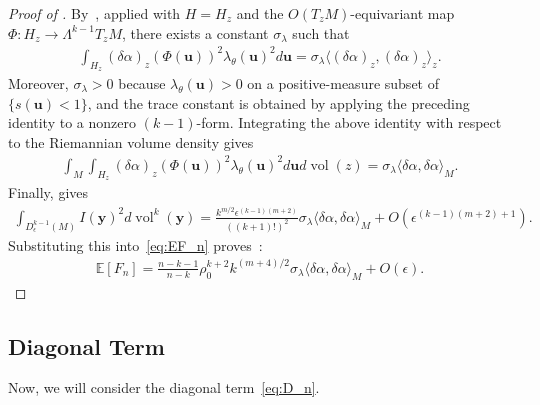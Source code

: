 \documentclass[11pt,reqno]{amsproc}
\numberwithin{equation}{section}
\newcommand{\E}{\mathbb{E}}
\newcommand{\by}{\mathbf{y}}
\newcommand{\bu}{\mathbf{u}}
\newcommand{\vol}{\operatorname{vol}}
\newcommand{\dvol}{d\!\vol}
\theoremstyle{definition}
\theoremstyle{plain}
\begin{document}
\begin{proof}[Proof of ]

By~, applied with $H=H_z$ and the $O(T_zM)$-equivariant map $\Phi:H_z\to \Lambda^{k-1}T_zM$, there exists a constant $\sigma_\lambda$ such that
\begin{align}
    \int_{H_z}(\delta\alpha)_z(\Phi(\bu))^2\lambda_\theta(\bu)^2d\bu=\sigma_\lambda\langle (\delta\alpha)_z,(\delta\alpha)_z\rangle_z.
\end{align}
Moreover, $\sigma_\lambda>0$ because $\lambda_\theta(\bu)>0$ on a positive-measure subset of $\{s(\bu)<1\}$, and the trace constant is obtained by applying the preceding identity to a nonzero $(k-1)$-form.
Integrating the above identity with respect to the Riemannian volume density gives
\begin{align}
    \int_M\int_{H_z}(\delta\alpha)_z(\Phi(\bu))^2\lambda_\theta(\bu)^2d\bu\dvol(z)=\sigma_\lambda\langle \delta\alpha,\delta\alpha\rangle_M.
\end{align}
Finally,  gives
\begin{align}
    \int_{D^{k-1}_\epsilon(M)}I(\by)^2\dvol^k(\by)
    =\frac{k^{m/2}\epsilon^{(k-1)(m+2)}}{((k+1)!)^2}\sigma_\lambda\langle\delta\alpha,\delta\alpha\rangle_M+O(\epsilon^{(k-1)(m+2)+1}).
\end{align}
Substituting this into~\eqref{eq:EF_n} proves~:
\begin{align}
    \E[F_n] = \frac{n-k-1}{n-k}\rho_0^{k+2}k^{(m+4)/2}\sigma_\lambda\langle\delta\alpha,\delta\alpha\rangle_M+O(\epsilon).
\end{align}
\end{proof}



\subsection{Diagonal Term}
Now, we will consider the diagonal term~\eqref{eq:D_n}.
\end{document}

